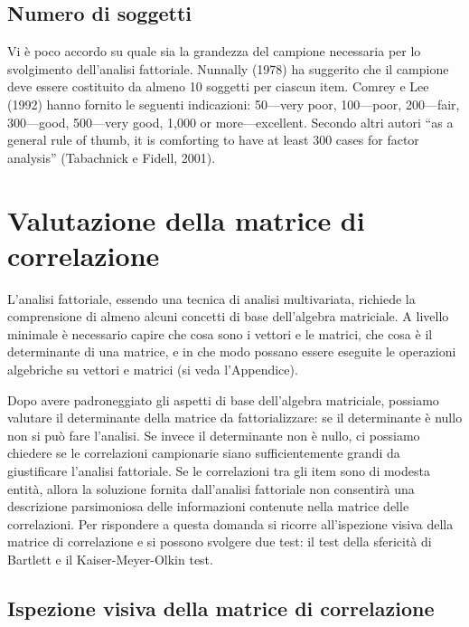\documentclass[
  11pt,
]{krantz}
\theoremstyle{definition}
\theoremstyle{definition}
\theoremstyle{definition}
\theoremstyle{definition}
\theoremstyle{remark}
\begin{document}
\hypertarget{numero-di-soggetti}{%
\section{Numero di soggetti}\label{numero-di-soggetti}}

Vi è poco accordo su quale sia la grandezza del campione necessaria per lo svolgimento dell'analisi fattoriale. Nunnally (1978) ha suggerito che il campione deve essere costituito da almeno 10 soggetti per ciascun item. Comrey e Lee (1992) hanno fornito le seguenti indicazioni: 50---very poor, 100---poor, 200---fair, 300---good, 500---very good, 1,000 or more---excellent. Secondo altri autori ``as a general rule of thumb, it is comforting to have at least 300 cases for factor analysis'' (Tabachnick e Fidell, 2001).

\hypertarget{ch:val_matrici}{%
\chapter{Valutazione della matrice di correlazione}\label{ch:val_matrici}}

L'analisi fattoriale, essendo una tecnica di analisi multivariata, richiede la comprensione di almeno alcuni concetti di base dell'algebra matriciale. A livello minimale è necessario capire che cosa sono i vettori e le matrici, che cosa è il determinante di una matrice, e in che modo possano essere eseguite le operazioni algebriche su vettori e matrici (si veda l'Appendice).

Dopo avere padroneggiato gli aspetti di base dell'algebra matriciale, possiamo valutare il determinante della matrice da fattorializzare: se il determinante è nullo non si può fare l'analisi. Se invece il determinante non è nullo, ci possiamo chiedere se le correlazioni campionarie siano sufficientemente grandi da giustificare l'analisi fattoriale. Se le correlazioni tra gli item sono di modesta entità, allora la soluzione fornita dall'analisi fattoriale non consentirà una descrizione parsimoniosa delle informazioni contenute nella matrice delle correlazioni. Per rispondere a questa domanda si ricorre all'ispezione visiva della matrice di correlazione e si possono svolgere due test: il test della sfericità di Bartlett e il Kaiser-Meyer-Olkin test.

\hypertarget{ispezione-visiva-della-matrice-di-correlazione}{%
\section{Ispezione visiva della matrice di correlazione}\label{ispezione-visiva-della-matrice-di-correlazione}}
\end{document}
